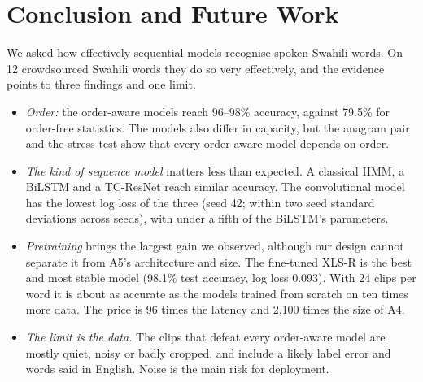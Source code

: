 \section{Conclusion and Future Work}
\label{sec:conclusion}

We asked how effectively sequential models recognise spoken Swahili words. On 12 crowdsourced Swahili words they do
so very effectively, and the evidence points to three findings and one limit.
\begin{itemize}
  \item \emph{Order:} the order-aware models reach 96--98\% accuracy, against 79.5\% for order-free statistics. The
        models also differ in capacity, but the anagram pair and the stress test show that every order-aware model
        depends on order.
  \item \emph{The kind of sequence model} matters less than expected. A classical HMM, a BiLSTM and a TC-ResNet reach
        similar accuracy. The convolutional model has the lowest log loss of the three (seed 42; within two seed
        standard deviations across seeds), with under a fifth of the BiLSTM's parameters.
  \item \emph{Pretraining} brings the largest gain we observed, although our design cannot separate it from A5's
        architecture and size. The fine-tuned XLS-R is the best and most stable model (98.1\% test accuracy, log
        loss 0.093). With 24 clips per word it is about as accurate as the models trained from scratch on ten times
        more data. The price is 96 times the latency and 2{,}100 times the size of A4.
  \item \emph{The limit is the data.} The clips that defeat every order-aware model are mostly quiet, noisy or badly
        cropped, and include a likely label error and words said in English. Noise is the main risk for deployment.
\end{itemize}

